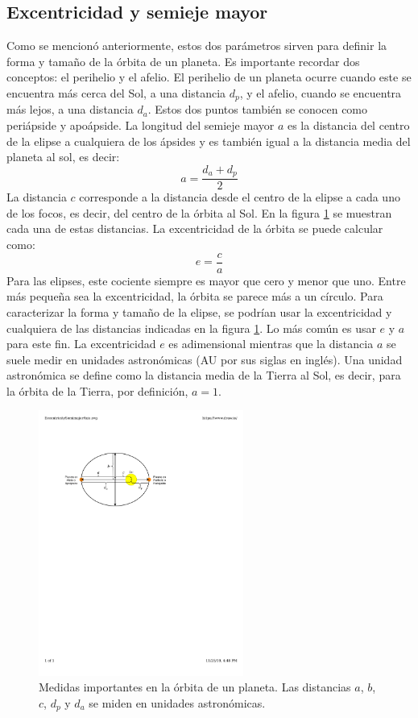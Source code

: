 \documentclass[a4paper,10pt]{article}
\begin{document}
\subsection{Excentricidad y semieje mayor}
Como se mencionó anteriormente, estos dos parámetros sirven para definir la forma y tamaño de la órbita de un planeta. Es importante recordar dos conceptos: el perihelio y el afelio. El perihelio de un planeta ocurre cuando este se encuentra más cerca del Sol, a una distancia $d_p$, y el afelio, cuando se encuentra más lejos, a una distancia $d_a$. Estos dos puntos también se conocen como periápside y apoápside. La longitud del semieje mayor $a$ es la distancia del centro de la elipse a cualquiera de los ápsides y es también igual a la distancia media del planeta al sol, es decir:
\[a = \frac{d_a + d_p}{2}\]
La distancia $c$ corresponde a la distancia desde el centro de la elipse a cada uno de los focos, es decir, del centro de la órbita al Sol. En la figura \ref{fig:Ellipse} se muestran cada una de estas distancias. La excentricidad de la órbita se puede calcular como:
\begin{equation}
  e = \frac{c}{a}
\end{equation}
Para las elipses, este cociente siempre es mayor que cero y menor que uno. Entre más pequeña sea la excentricidad, la órbita se parece más a un círculo. Para caracterizar la forma y tamaño de la elipse, se podrían usar la excentricidad y cualquiera de las distancias indicadas en la figura \ref{fig:Ellipse}. Lo más común es usar $e$ y $a$ para este fin. La excentricidad $e$ es adimensional mientras que la distancia $a$ se suele medir en unidades astronómicas (AU por sus siglas en inglés). Una unidad astronómica se define como la distancia media de la Tierra al Sol, es decir, para la órbita de la Tierra, por definición, $a=1$.
\begin{figure}
  \centering
  \includegraphics[width=0.6\textwidth]{Figures/EccentricitySemimajorAxis.pdf}
  \caption{Medidas importantes en la órbita de un planeta. Las distancias $a$, $b$, $c$, $d_p$ y $d_a$ se miden en unidades astronómicas.}
  \label{fig:Ellipse}
\end{figure}
\end{document}
